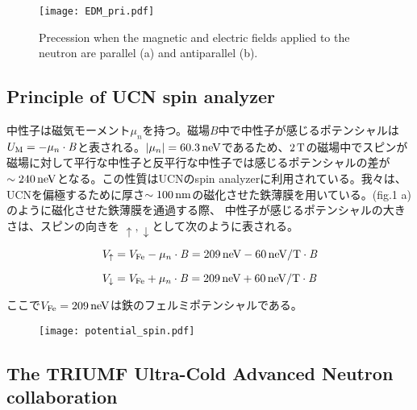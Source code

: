 \documentclass[onecolumn]{preport}
\begin{document}
\begin{figure}[tbh]
 \centering
 \texttt{[image: EDM\_pri.pdf]}
 \caption{Precession when the magnetic and electric fields applied to the neutron are parallel (a) and antiparallel (b).}
\end{figure}


\subsection{Principle of UCN spin analyzer}
中性子は磁気モーメント$\mu_n$を持つ。磁場$B$中で中性子が感じるポテンシャルは$U_{\rm M}=-\mu_n\cdot {\bf \it B}$と表される。$|\mu_n|=60.3\,\rm neV$であるため、$2\,\rm T$の磁場中でスピンが磁場に対して平行な中性子と反平行な中性子では感じるポテンシャルの差が$\sim 240\,\rm neV$となる。この性質はUCNのspin analyzerに利用されている。我々は、UCNを偏極するために厚さ$\sim 100\,\rm nm$の磁化させた鉄薄膜を用いている。(fig.1 a)のように磁化させた鉄薄膜を通過する際、
中性子が感じるポテンシャルの大きさは、スピンの向きを
$\uparrow, \downarrow$として次のように表される。

\begin{equation}
    V_{\uparrow}=V_{\rm Fe}-\mu_n\cdot {\bf \it B}=209\,\rm neV- 60\,\rm neV/T \cdot {\bf \it B}
\end{equation}

\begin{equation}
    V_{\downarrow}=V_{\rm Fe}+\mu_n\cdot {\bf \it B}=209\,\rm neV+60\,\rm neV/T \cdot {\bf \it B}
\end{equation}

ここで$V_{\rm Fe}=209\,\rm neV$は鉄のフェルミポテンシャルである。




\begin{figure}[tbh]
 \centering
 \texttt{[image: potential\_spin.pdf]}
 \caption{}
\end{figure}



\subsection{The TRIUMF Ultra-Cold Advanced Neutron collaboration}
\end{document}
